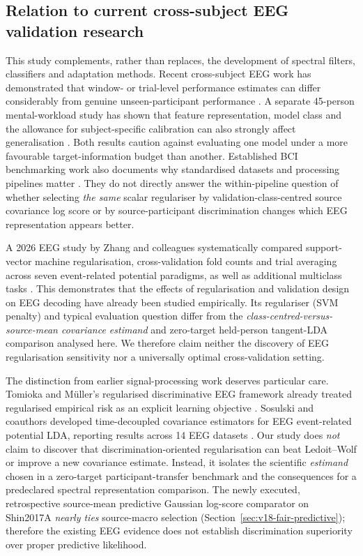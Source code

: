 
\subsection{Relation to current cross-subject EEG validation research}
This study complements, rather than replaces, the development of
spectral filters, classifiers and adaptation methods. Recent
cross-subject EEG work has demonstrated that window- or trial-level
performance estimates can differ considerably from genuine
unseen-participant performance \cite{gil2026subjectvalidation}. A
separate 45-person mental-workload study has shown that feature
representation, model class and the allowance for subject-specific
calibration can also strongly affect generalisation
\cite{abinaya2026wavelet}. Both results caution against evaluating
one model under a more favourable target-information budget than
another. Established BCI benchmarking work also documents why
standardised datasets and processing pipelines matter
\cite{jayaram2018moabb}. They do not directly answer the within-pipeline question
of whether selecting \emph{the same} scalar regulariser by
validation-class-centred source covariance log score or by
source-participant discrimination changes which EEG representation appears better.

A 2026 EEG study by Zhang and colleagues systematically compared
support-vector machine regularisation, cross-validation fold counts
and trial averaging across seven event-related potential paradigms,
as well as additional multiclass tasks
\cite{zhang2026svmeeg}. This demonstrates that the effects of
regularisation and validation design on EEG decoding have already
been studied empirically. Its regulariser (SVM penalty) and
typical evaluation question differ from the
\emph{class-centred-versus-source-mean covariance estimand}
and zero-target held-person tangent-LDA comparison analysed
here. We therefore claim neither the discovery of EEG
regularisation sensitivity nor a universally optimal
cross-validation setting.

The distinction from earlier signal-processing work deserves particular
care. Tomioka and M{\"u}ller's regularised discriminative EEG framework
already treated regularised empirical risk as an explicit learning
objective \cite{tomioka2010regularized}. Sosulski and coauthors
developed time-decoupled covariance estimators for EEG event-related
potential LDA, reporting results across 14 EEG datasets
\cite{sosulski2021tinycovariance}. Our study does \emph{not}
claim to discover that discrimination-oriented regularisation
can beat Ledoit--Wolf or improve a new covariance estimate.
Instead, it isolates the scientific \emph{estimand} chosen in a
zero-target participant-transfer benchmark and the consequences for
a predeclared spectral representation comparison. The newly executed, retrospective source-mean predictive Gaussian
log-score comparator on Shin2017A \emph{nearly ties} source-macro
selection (Section~\ref{sec:v18-fair-predictive}); therefore the
existing EEG evidence does not establish discrimination superiority
over proper predictive likelihood.

